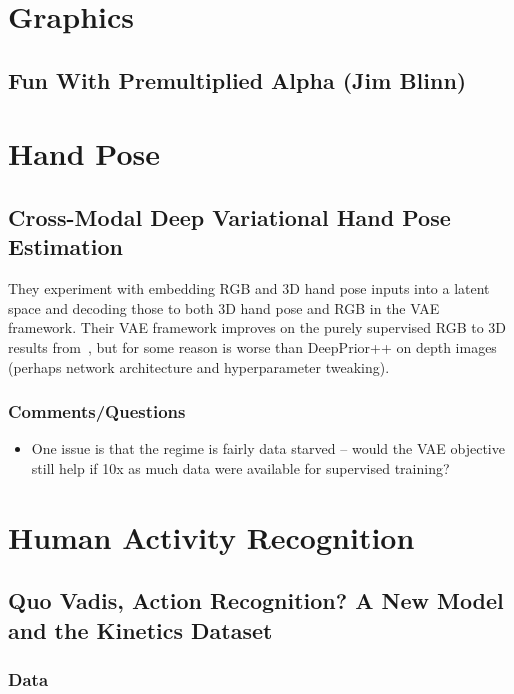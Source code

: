 \documentclass[a4paper, 12pt]{article}
\begin{document}
\section{Graphics}


\subsection{Fun With Premultiplied Alpha (Jim Blinn)}


\section{Hand Pose}


\subsection{Cross-Modal Deep Variational Hand Pose
            Estimation~\cite{spurr2018crossmodal}}

They experiment with embedding RGB and 3D hand pose inputs into a latent space
and decoding those to both 3D hand pose and RGB in the VAE framework. Their VAE
framework improves on the purely supervised RGB to 3D results
from~\cite{zb2017hand}, but for some reason is worse than DeepPrior++ on depth
images (perhaps network architecture and hyperparameter tweaking).


\subsubsection{Comments/Questions}

\begin{itemize}
        \item One issue is that the regime is fairly data starved -- would the
                VAE objective still help if 10x as much data were available for
                supervised training?
\end{itemize}


\section{Human Activity Recognition}


\subsection{Quo Vadis, Action Recognition? A New Model and the Kinetics
            Dataset\citet{carreira2017quo}}

\subsubsection{Data}
\end{document}
